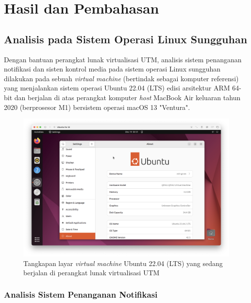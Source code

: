 \chapter{Hasil dan Pembahasan}

\section{Analisis pada Sistem Operasi Linux Sungguhan}

Dengan bantuan perangkat lunak virtualisasi UTM, analisis sistem penanganan notifikasi dan sisten kontrol media pada sistem operasi Linux sungguhan dilakukan pada sebuah \textit{virtual machine} (bertindak sebagai komputer referensi) yang menjalankan sistem operasi Ubuntu 22.04 (LTS) edisi arsitektur ARM 64-bit dan berjalan di atas perangkat komputer \textit{host} MacBook Air keluaran tahun 2020 (berprosesor M1) bersistem operasi macOS 13 "Ventura".

\begin{figure}[h]
    \centering
    \includegraphics[width=0.75\linewidth]{archives//contents-template-pak-prapto//chapter-4/Screenshot 2023-12-19 at 10.51.04.png}
    \caption{Tangkapan layar \textit{virtual machine} Ubuntu 22.04 (LTS) yang sedang berjalan di perangkat lunak virtualisasi UTM}
    \label{fig:enter-label}
\end{figure}

\subsection{Analisis Sistem Penanganan Notifikasi}


